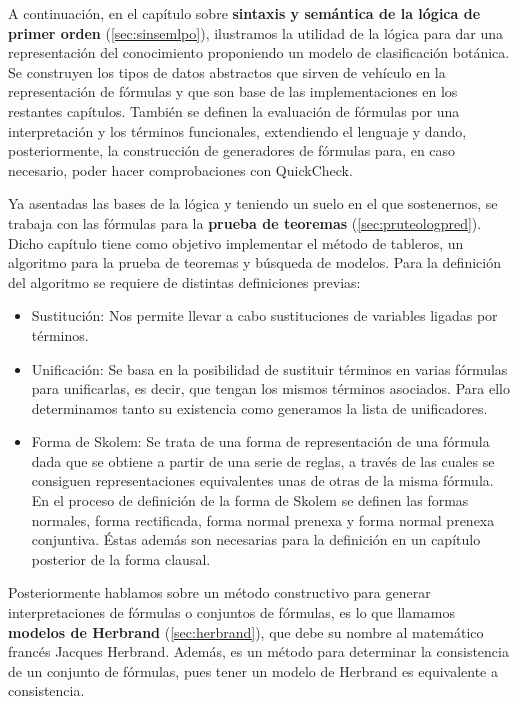 A continuación, en el capítulo sobre \textbf{sintaxis y semántica de la lógica de primer orden}
(\ref{sec:sinsemlpo}), ilustramos la utilidad de la lógica para dar una representación del conocimiento proponiendo un modelo de clasificación botánica. Se construyen los tipos de datos abstractos que sirven de vehículo en la representación de fórmulas y que son base de las implementaciones en los restantes capítulos. También se definen la evaluación de fórmulas por una interpretación y los términos funcionales, extendiendo el lenguaje y dando, posteriormente, la construcción de generadores de fórmulas
para, en caso necesario, poder hacer comprobaciones con QuickCheck. 

Ya asentadas las bases de la lógica y teniendo un suelo en el que sostenernos, se trabaja
con las fórmulas para la \textbf{prueba de teoremas} (\ref{sec:pruteologpred}). Dicho capítulo tiene
como objetivo implementar el método de tableros, un algoritmo para la prueba de teoremas y búsqueda de modelos. Para la definición del algoritmo se requiere de distintas definiciones previas:

\begin{itemize}
\item Sustitución: Nos permite llevar a cabo sustituciones de variables ligadas por términos.
\item Unificación: Se basa en la posibilidad de sustituir términos en varias fórmulas para
  unificarlas, es decir, que tengan los mismos términos asociados. Para ello determinamos tanto su
  existencia como generamos la lista de unificadores.
\item Forma de Skolem: Se trata de una forma de representación de una fórmula dada que se obtiene
  a partir de una serie de reglas, a través de las cuales se consiguen representaciones equivalentes
  unas de otras de la misma fórmula. En el proceso de definición de la forma de Skolem se definen
  las formas normales, forma rectificada, forma normal prenexa y forma normal prenexa conjuntiva. Éstas además son necesarias para la definición en un capítulo posterior de la forma clausal. 
\end{itemize}

Posteriormente hablamos sobre un método constructivo para generar interpretaciones de fórmulas
o conjuntos de fórmulas, es lo que llamamos \textbf{modelos de Herbrand} (\ref{sec:herbrand}),
que debe su nombre al matemático francés Jacques Herbrand. Además, es un método para determinar
la consistencia de un conjunto de fórmulas, pues tener un modelo de Herbrand es equivalente a consistencia. 

